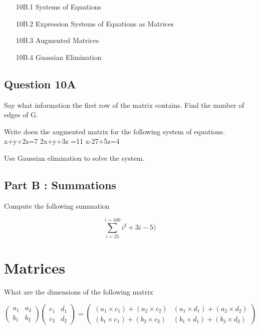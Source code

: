 \documentclass[]{report}
\begin{document}
\begin{itemize}
	\item[10B.1] Systems of Equations
	\item[10B.2] Expression Systems of Equations as Matrices
	\item[10B.3] Augmented Matrices
	\item[10B.4] Guassian Elimination
\end{itemize}
\subsection*{Question 10A}

Say what information the first row of the matrix contains.
Find the number of edges of G.


Write doen the augmented matrix for the following system of equations.
x+y+2z=7
2x+y+3z =11
x-27+5z=4


Use Gaussian elimination to solve the system.

\subsection*{Part B : Summations}

Compute the following summation

\[ \sum^{i=100}_{i=25} i^2 + 3i -5)\]

\section{Matrices}

What are the dimensions of the following matrix


\[ \left(
\begin{array}{cc}
a_1 & a_2 \\ 
b_1 & b_2
\end{array} \right)\left(
\begin{array}{cc}
c_1 & d_1 \\ 
c_2 & d_2
\end{array} \right) = \left(
\begin{array}{cc}
(a_1 \times c_1) + (a_2 \times c_2) & (a_1 \times d_1) + (a_2 \times d_2) \\ 
(b_1 \times c_1) + (b_2 \times c_2) & (b_1 \times d_1) + (b_2 \times d_2)
\end{array} \right) \]
\end{document}
